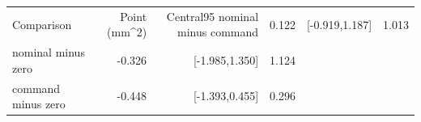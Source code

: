 \begin{tabular}{lrrr}
\toprule
Comparison & Point (mm^2) & Central95%
\midrule
nominal minus command & 0.122 & [-0.919,1.187] & 1.013\\
nominal minus zero & -0.326 & [-1.985,1.350] & 1.124\\
command minus zero & -0.448 & [-1.393,0.455] & 0.296\\
\bottomrule
\end{tabular}
